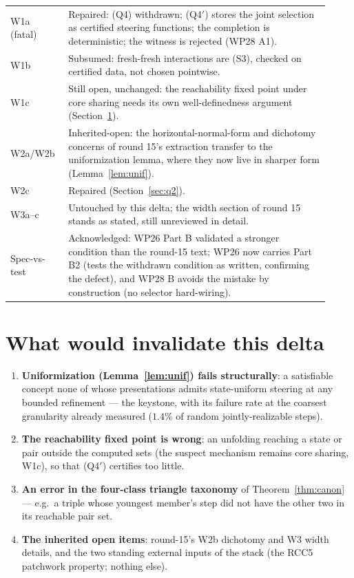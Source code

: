 \documentclass[11pt]{article}
\theoremstyle{definition}
\begin{document}
\begin{center}
\begin{tabular}{p{0.16\linewidth}p{0.76\linewidth}}
\toprule
W1a (fatal) & Repaired: (Q4) withdrawn; (Q4$'$) stores the joint
selection as certified steering functions; the completion is
deterministic; the witness is rejected (WP28 A1).\\
W1b & Subsumed: fresh-fresh interactions are (S3), checked on certified
data, not chosen pointwise.\\
W1c & Still open, unchanged: the reachability fixed point under core
sharing needs its own well-definedness argument
(Section~\ref{sec:invalidate}).\\
W2a/W2b & Inherited-open: the horizontal-normal-form and dichotomy
concerns of round 15's extraction transfer to the uniformization lemma,
where they now live in sharper form (Lemma~\ref{lem:unif}).\\
W2c & Repaired (Section~\ref{sec:q2}).\\
W3a--c & Untouched by this delta; the width section of round 15 stands
as stated, still unreviewed in detail.\\
Spec-vs-test & Acknowledged: WP26 Part B validated a stronger condition
than the round-15 text; WP26 now carries Part B2 (tests the withdrawn
condition as written, confirming the defect), and WP28 B avoids the
mistake by construction (no selector hard-wiring).\\
\bottomrule
\end{tabular}
\end{center}

\section{What would invalidate this delta}\label{sec:invalidate}

\begin{enumerate}[label=(X\arabic*),leftmargin=2.6em]
\item \textbf{Uniformization (Lemma~\ref{lem:unif}) fails structurally}:
a satisfiable concept none of whose presentations admits state-uniform
steering at any bounded refinement --- the keystone, with its failure
rate at the coarsest granularity already measured ($1.4\%$ of random
jointly-realizable steps).
\item \textbf{The reachability fixed point is wrong}: an unfolding
reaching a state or pair outside the computed sets (the suspect
mechanism remains core sharing, W1c), so that (Q4$'$) certifies too
little.
\item \textbf{An error in the four-class triangle taxonomy} of
Theorem~\ref{thm:canon} --- e.g.\ a triple whose youngest member's step
did not have the other two in its reachable pair set.
\item \textbf{The inherited open items}: round-15's W2b dichotomy and
W3 width details, and the two standing external inputs of the stack
(the RCC5 patchwork property; nothing else).
\end{enumerate}
\end{document}
